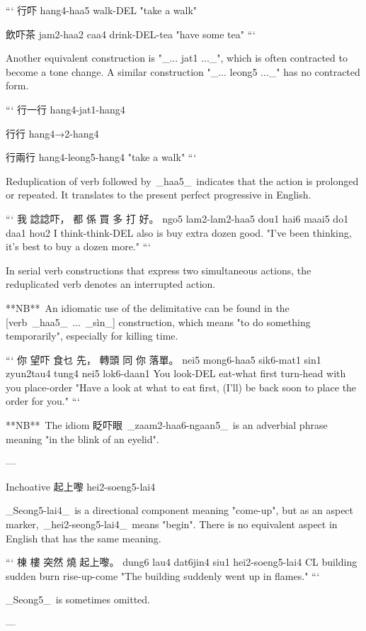 ```
行吓 
hang4-haa5
walk-DEL  
"take a walk"  

飲吓茶 
jam2-haa2 caa4 
drink-DEL-tea
"have some tea"  
```

Another equivalent construction is "_... jat1 ..._", which is often contracted to become a tone change. A similar construction "_... leong5 ..._" has no contracted form.

```
行一行 
hang4-jat1-hang4

行行 
hang4→2-hang4

行兩行 
hang4-leong5-hang4
"take a walk"  
```

Reduplication of verb followed by _haa5_ indicates that the action is prolonged or repeated. It translates to the present perfect progressive in English.

```
我   諗諗吓，          都   係   買     多     打   好。
ngo5 lam2-lam2-haa5   dou1 hai6 maai5  do1   daa1  hou2
I    think-think-DEL  also is   buy    extra dozen good.
"I've been thinking, it's best to buy a dozen more."
```

In serial verb constructions that express two simultaneous actions, the reduplicated verb denotes an interrupted action.

**NB** An idiomatic use of the delimitative can be found in the [verb _haa5_ ... _sìn_] construction, which means "to do something temporarily", especially for killing time.

```
你   望吓        食乜      先，  轉頭       同    你   落單。
nei5 mong6-haa5 sik6-mat1 sin1  zyun2tau4 tung4 nei5 lok6-daan1
You  look-DEL   eat-what  first turn-head with  you  place-order
"Have a look at what to eat first, (I'll) be back soon to place the order for you." 
```

**NB** The idiom 眨吓眼 _zaam2-haa6-ngaan5_ is an adverbial phrase meaning "in the blink of an eyelid".

---

Inchoative 起上嚟 hei2-soeng5-lai4

_Seong5-lai4_ is a directional component meaning "come-up", but as an aspect marker, _hei2-seong5-lai4_ means "begin". There is no equivalent aspect in English that has the same meaning.

```
棟    樓           突然       燒   起上嚟。  
dung6 lau4        dat6jin4  siu1 hei2-soeng5-lai4  
CL    building    sudden    burn rise-up-come
"The building suddenly went up in flames."  
```

_Seong5_ is sometimes omitted.

---


